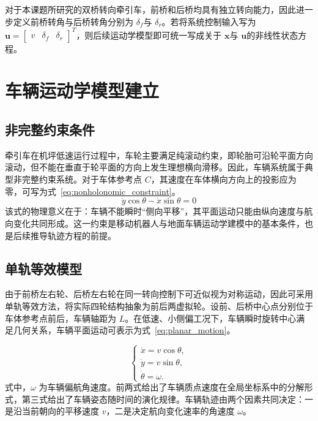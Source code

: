 对于本课题所研究的双桥转向牵引车，前桥和后桥均具有独立转向能力，因此进一步定义前桥转角与后桥转角分别为
\(\delta_{f}\)与
\(\delta_{r}\)。若将系统控制输入写为\(\mathbf{u} = \begin{bmatrix}
v & \delta_{f} & \delta_{r}
\end{bmatrix}^{T}\)，则后续运动学模型即可统一写成关于 \(\mathbf{x}\)与
\(\mathbf{u}\)的非线性状态方程。

\section{车辆运动学模型建立}

\subsection{非完整约束条件}

牵引车在机坪低速运行过程中，车轮主要满足纯滚动约束，即轮胎可沿轮平面方向滚动，但不能在垂直于轮平面的方向上发生理想横向滑移。因此，车辆系统属于典型非完整约束系统。对于车体参考点
\(C\)，其速度在车体横向方向上的投影应为零，可写为式~\ref{eq:nonholonomic_constraint}。
\begin{equation}
\dot{y}\cos\theta - \dot{x}\sin\theta = 0
\label{eq:nonholonomic_constraint}
\end{equation}
该式的物理意义在于：车辆不能瞬时``侧向平移''，其平面运动只能由纵向速度与航向变化共同形成。这一约束是移动机器人与地面车辆运动学建模中的基本条件，也是后续推导轨迹方程的前提\cite{ref17,ref19}。

\subsection{单轨等效模型}

由于前桥左右轮、后桥左右轮在同一转向控制下可近似视为对称运动，因此可采用单轨等效方法，将实际四轮结构抽象为前后两虚拟轮\cite{ref19}。设前、后桥中心点分别位于车体参考点前后，车辆轴距为
\(L\)。在低速、小侧偏工况下，车辆瞬时旋转中心满足几何关系，车辆平面运动可表示为式~\ref{eq:planar_motion}。

\begin{equation}
\begin{cases}
\dot{x}=v\cos\theta,\\
\dot{y}=v\sin\theta,\\
\dot{\theta}=\omega.
\end{cases}
\label{eq:planar_motion}
\end{equation}
式中，\(\omega\)
为车辆偏航角速度。前两式给出了车辆质点速度在全局坐标系中的分解形式，第三式给出了车辆姿态随时间的演化规律。车辆轨迹由两个因素共同决定：一是沿当前朝向的平移速度
\(v\)，二是决定航向变化速率的角速度 \(\omega\)。

